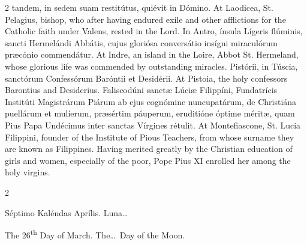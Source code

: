 \begin{paracol}{2}
 tandem, in sedem suam restitútus, quiévit in Dómino.
\switchcolumn
{}
At Laodicea, St. Pelagius, bishop, who after having endured exile and other 
 afflictions for the Catholic faith under Valens, rested in the Lord.
\switchcolumn*
{}
In Antro, ínsula Lígeris flúminis, sancti 
 Hermelándi Abbátis, cujus gloriósa conversátio insígni miraculórum præcónio 
 commendátur.
\switchcolumn
{}
At Indre, an island in the Loire, Abbot St. Hermeland, whose glorious life 
 was commended by outstanding miracles.
\switchcolumn*
{}
Pistórii, in Túscia, sanctórum Confessórum Baróntii et Desidérii.
\switchcolumn
{}
At Pistoia, the holy confessors Barontius and Desiderius.
\switchcolumn*
{}
Faliscodúni sanctæ 
 Lúciæ Filippíni, Fundatrícis Institúti Magistrárum Piárum ab ejus cognómine 
 nuncupatárum, de Christiána puellárum et mulíerum, præsértim páuperum, 
 eruditióne óptime méritæ, quam Pius Papa Undécimus inter sanctas Vírgines 
 rétulit.
\switchcolumn
{}
At Montefiascone, St. Lucia Filippini, founder of the Institute of Pious 
 Teachers, from whose surname they are known as Filippines. 
 Having merited greatly by the Christian education of girls and women, 
 especially of the poor, Pope Pius XI enrolled her among the holy virgins.
\switchcolumn*
{}
\end{paracol}


\begin{paracol}{2}
\begin{center}{\color{gregoriocolor} Séptimo Kaléndas Aprílis. 
 Luna\dots\ }\end{center}
\switchcolumn
{}
\begin{center}{\color{gregoriocolor} The 26\textsuperscript{th} Day of March. 
 The\dots\ Day of the Moon.}\end{center}
\end{paracol}

